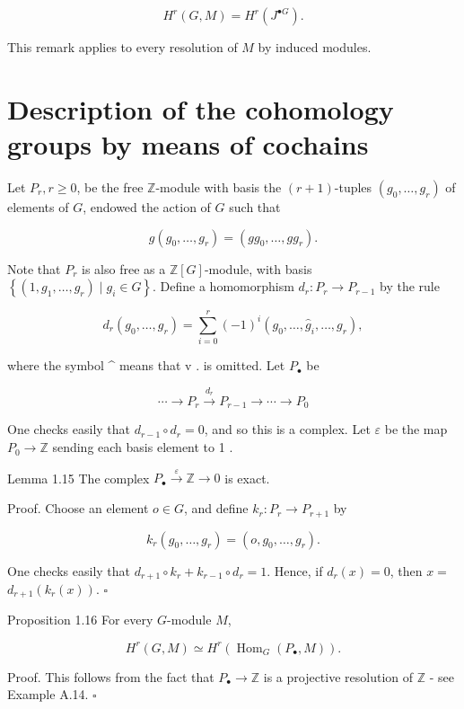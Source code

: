 \documentclass[10pt]{article}
\begin{document}
$$
H^{r}(G, M)=H^{r}\left(J^{\bullet G}\right) .
$$

This remark applies to every resolution of $M$ by induced modules.

\section*{Description of the cohomology groups by means of cochains}
Let $P_{r}, r \geq 0$, be the free $\mathbb{Z}$-module with basis the $(r+1)$-tuples $\left(g_{0}, \ldots, g_{r}\right)$ of elements of $G$, endowed the action of $G$ such that

$$
g\left(g_{0}, \ldots, g_{r}\right)=\left(g g_{0}, \ldots, g g_{r}\right) .
$$

Note that $P_{r}$ is also free as a $\mathbb{Z}[G]$-module, with basis $\left\{\left(1, g_{1}, \ldots, g_{r}\right) \mid g_{i} \in G\right\}$. Define a homomorphism $d_{r}: P_{r} \rightarrow P_{r-1}$ by the rule

$$
d_{r}\left(g_{0}, \ldots, g_{r}\right)=\sum_{i=0}^{r}(-1)^{i}\left(g_{0}, \ldots, \hat{g}_{i}, \ldots, g_{r}\right),
$$

where the symbol \^{} means that v . is omitted. Let $P_{\bullet}$ be

$$
\cdots \rightarrow P_{r} \xrightarrow{d_{r}} P_{r-1} \rightarrow \cdots \rightarrow P_{0}
$$

One checks easily that $d_{r-1} \circ d_{r}=0$, and so this is a complex. Let $\varepsilon$ be the map $P_{0} \rightarrow \mathbb{Z}$ sending each basis element to 1 .

Lemma 1.15 The complex $P_{\bullet} \stackrel{\varepsilon}{\rightarrow} \mathbb{Z} \rightarrow 0$ is exact.

Proof. Choose an element $o \in G$, and define $k_{r}: P_{r} \rightarrow P_{r+1}$ by

$$
k_{r}\left(g_{0}, \ldots, g_{r}\right)=\left(o, g_{0}, \ldots, g_{r}\right) .
$$

One checks easily that $d_{r+1} \circ k_{r}+k_{r-1} \circ d_{r}=1$. Hence, if $d_{r}(x)=0$, then $x=$ $d_{r+1}\left(k_{r}(x)\right)$. \(\square\)

Proposition 1.16 For every $G$-module $M$,

$$
H^{r}(G, M) \simeq H^{r}\left(\operatorname{Hom}_{G}\left(P_{\bullet}, M\right)\right) .
$$

Proof. This follows from the fact that $P_{\bullet} \rightarrow \mathbb{Z}$ is a projective resolution of $\mathbb{Z}$ - see Example A.14. \(\square\)
\end{document}

